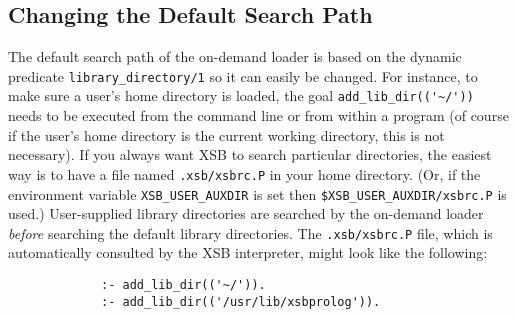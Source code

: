 \subsection{Changing the Default Search Path} \label{sec:search-path}
The default search path of the on-demand loader is based on the
dynamic predicate {\tt library\_directory/1} so it can easily be
changed.  For instance, to make sure a user's home directory is
loaded, the goal \verb|add_lib_dir(('~/'))| needs to be executed from
the
command line or from within a program (of course if the user's home
directory is the current working directory, this is not necessary).
If you always want XSB to search particular directories, the easiest
way is to have a file named {\verb|.xsb/xsbrc.P|} in your home
directory.  (Or, if the environment variable
\texttt{XSB\_USER\_AUXDIR} is set then
       {\verb|$XSB_USER_AUXDIR/xsbrc.P|} is used.)  User-supplied
       library directories are searched by the on-demand loader {\em
         before} searching the default library directories.  The
       {\verb|.xsb/xsbrc.P|} file, which is automatically consulted by
       the XSB interpreter, might look like the following:
\begin{verbatim}
             :- add_lib_dir(('~/')).
             :- add_lib_dir(('/usr/lib/xsbprolog')).
\end{verbatim}


